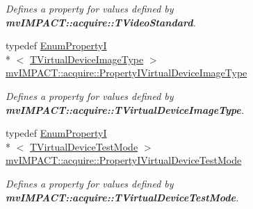 \begin{DoxyCompactItemize}
\begin{DoxyCompactList}\small\item\em Defines a property for values defined by {\bfseries mv\+I\+M\+P\+A\+C\+T\+::acquire\+::\+T\+Video\+Standard}. \end{DoxyCompactList}\item 
\hypertarget{group___device_specific_interface_gacfecce2b643c06f4a31fbced42789247}{typedef \hyperlink{classmv_i_m_p_a_c_t_1_1acquire_1_1_enum_property_i}{Enum\+Property\+I}\\*
$<$ \hyperlink{group___device_specific_interface_ga5b29826e8e9b1e0b25124f77ac6ff6e5}{T\+Virtual\+Device\+Image\+Type} $>$ \hyperlink{group___device_specific_interface_gacfecce2b643c06f4a31fbced42789247}{mv\+I\+M\+P\+A\+C\+T\+::acquire\+::\+Property\+I\+Virtual\+Device\+Image\+Type}}\label{group___device_specific_interface_gacfecce2b643c06f4a31fbced42789247}

\begin{DoxyCompactList}\small\item\em Defines a property for values defined by {\bfseries mv\+I\+M\+P\+A\+C\+T\+::acquire\+::\+T\+Virtual\+Device\+Image\+Type}. \end{DoxyCompactList}\item 
\hypertarget{group___device_specific_interface_ga3e8eeaeee6e265c687f5f1bcc8f086a6}{typedef \hyperlink{classmv_i_m_p_a_c_t_1_1acquire_1_1_enum_property_i}{Enum\+Property\+I}\\*
$<$ \hyperlink{group___device_specific_interface_ga7d26416f3dfdd24d6331fcf6bfd32a38}{T\+Virtual\+Device\+Test\+Mode} $>$ \hyperlink{group___device_specific_interface_ga3e8eeaeee6e265c687f5f1bcc8f086a6}{mv\+I\+M\+P\+A\+C\+T\+::acquire\+::\+Property\+I\+Virtual\+Device\+Test\+Mode}}\label{group___device_specific_interface_ga3e8eeaeee6e265c687f5f1bcc8f086a6}

\begin{DoxyCompactList}\small\item\em Defines a property for values defined by {\bfseries mv\+I\+M\+P\+A\+C\+T\+::acquire\+::\+T\+Virtual\+Device\+Test\+Mode}. \end{DoxyCompactList}\end{DoxyCompactItemize}
